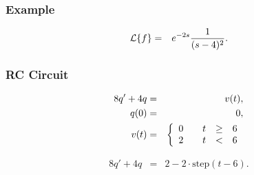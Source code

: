 \begin{frame}
  \frametitle{Example}

  \begin{eqnarray*}
    \laplace{f} & = & e^{-2s}\frac{1}{(s-4)^2}.
  \end{eqnarray*}


\end{frame}





\begin{frame}
  \frametitle{RC Circuit}

      


  \begin{eqnarray*}
    8q' + 4q & = & v(t), \\
    q(0) & = & 0, \\
    v(t) & = & 
    \left\{
      \begin{array}{r@{\hspace{2em}}rcl}
        0 & t & \geq & 6 \\
        2 & t & < & 6
      \end{array}
    \right.
  \end{eqnarray*}

  {
    \begin{eqnarray*}
      8q' + 4q & = & 2 - 2 \cdot \mathrm{step}(t-6).
    \end{eqnarray*}
        
  }

\end{frame}


